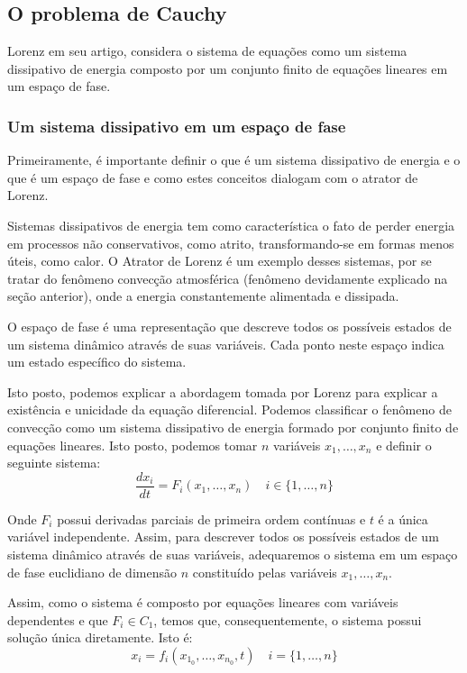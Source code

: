 \documentclass[12pt, a4paper]{article}
\begin{document}
\subsection{O problema de Cauchy}
Lorenz em seu artigo, considera o sistema de equações como um sistema
dissipativo de energia composto por um conjunto finito de equações lineares em
um espaço de fase.

\subsubsection{Um sistema dissipativo em um espaço de fase}

Primeiramente, é importante definir o que é um sistema dissipativo de
energia e o que é um espaço de fase e como estes conceitos dialogam com o
atrator de Lorenz.

Sistemas dissipativos de energia tem como característica o fato de perder
energia em processos não conservativos, como atrito, transformando-se em formas
menos úteis, como calor. O Atrator de Lorenz é um exemplo desses sistemas, por
se tratar do fenômeno convecção atmosférica (fenômeno devidamente explicado na
seção anterior), onde a energia constantemente alimentada e dissipada.

O espaço de fase é uma representação que descreve todos os possíveis
estados de um sistema dinâmico através de suas variáveis. Cada ponto neste
espaço indica um estado específico do sistema.

Isto posto, podemos explicar a abordagem tomada por Lorenz para explicar a
existência e unicidade da equação diferencial. Podemos classificar o fenômeno
de convecção como um sistema dissipativo de energia formado por conjunto finito
de equações lineares. Isto posto, podemos tomar $n$ variáveis $x_1, \ldots,
    x_n$ e definir o seguinte sistema:
\begin{equation}
    \frac{dx_i}{dt} = F_i\left(x_1, \ldots, x_n\right) \quad i \in \{1,
    \ldots, n\}
\end{equation}

Onde $F_i$ possui derivadas parciais de primeira ordem contínuas e $t$ é a
única variável independente. Assim, para descrever todos os possíveis estados
de um sistema dinâmico através de suas variáveis, adequaremos o sistema em um
espaço de fase euclidiano de dimensão $n$ constituído pelas variáveis $x_1,
    \ldots, x_n$.

Assim, como o sistema é composto por equações lineares com variáveis
dependentes e que $F_i \in C_1$, temos que, consequentemente, o sistema possui
solução única diretamente. Isto é:
\begin{equation}
    x_i = f_i(x_{1_0}, \ldots, x_{n_0}, t) \quad i = \{1, \ldots, n\}
\end{equation}
\end{document}
